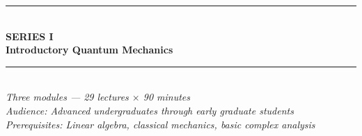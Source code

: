 \documentclass[11pt,a4paper]{article}
\begin{document}
\newpage

\newpage
\thispagestyle{empty}
\pagecolor{darkblue}
\color{white}
\vspace*{2.2cm}
\begin{center}
  {\color{accentgold}\rule{11cm}{1.5pt}}\\[0.5cm]
  {\fontsize{11}{14}\selectfont\bfseries\color{accentgold}\MakeUppercase{Series I}}\\[0.3cm]
  {\fontsize{26}{32}\selectfont\bfseries Introductory Quantum Mechanics}\\[0.4cm]
  {\color{accentgold}\rule{11cm}{1.5pt}}\\[1.0cm]
  {\large\itshape Three modules --- 29 lectures $\times$ 90 minutes}\\[0.5cm]
  {\normalsize\itshape Audience: Advanced undergraduates through early graduate students}\\[0.3cm]
  {\normalsize\itshape Prerequisites: Linear algebra, classical mechanics, basic complex analysis}\\[1.6cm]


\end{center}
\end{document}
